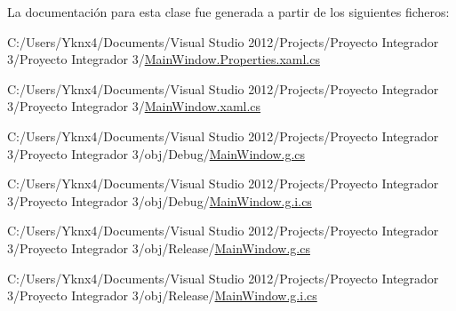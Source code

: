 La documentación para esta clase fue generada a partir de los siguientes ficheros\-:\begin{DoxyCompactItemize}
\item 
C\-:/\-Users/\-Yknx4/\-Documents/\-Visual Studio 2012/\-Projects/\-Proyecto Integrador 3/\-Proyecto Integrador 3/\hyperlink{_main_window_8_properties_8xaml_8cs}{Main\-Window.\-Properties.\-xaml.\-cs}\item 
C\-:/\-Users/\-Yknx4/\-Documents/\-Visual Studio 2012/\-Projects/\-Proyecto Integrador 3/\-Proyecto Integrador 3/\hyperlink{_main_window_8xaml_8cs}{Main\-Window.\-xaml.\-cs}\item 
C\-:/\-Users/\-Yknx4/\-Documents/\-Visual Studio 2012/\-Projects/\-Proyecto Integrador 3/\-Proyecto Integrador 3/obj/\-Debug/\hyperlink{_debug_2_main_window_8g_8cs}{Main\-Window.\-g.\-cs}\item 
C\-:/\-Users/\-Yknx4/\-Documents/\-Visual Studio 2012/\-Projects/\-Proyecto Integrador 3/\-Proyecto Integrador 3/obj/\-Debug/\hyperlink{_debug_2_main_window_8g_8i_8cs}{Main\-Window.\-g.\-i.\-cs}\item 
C\-:/\-Users/\-Yknx4/\-Documents/\-Visual Studio 2012/\-Projects/\-Proyecto Integrador 3/\-Proyecto Integrador 3/obj/\-Release/\hyperlink{_release_2_main_window_8g_8cs}{Main\-Window.\-g.\-cs}\item 
C\-:/\-Users/\-Yknx4/\-Documents/\-Visual Studio 2012/\-Projects/\-Proyecto Integrador 3/\-Proyecto Integrador 3/obj/\-Release/\hyperlink{_release_2_main_window_8g_8i_8cs}{Main\-Window.\-g.\-i.\-cs}\end{DoxyCompactItemize}
